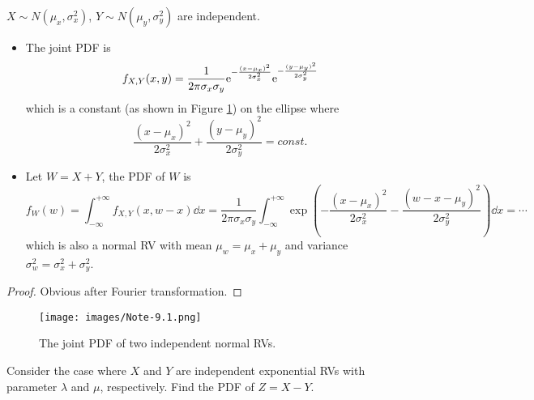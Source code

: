 \begin{example}
    $X \sim N(\mu_x, \sigma_x^2)$, $Y \sim N(\mu_y, \sigma_y^2)$ are independent. 
    \begin{itemize}
        \item The joint PDF is
        \begin{equation}
            f_{X, Y}(x, y) = \frac{1}{2 \pi \sigma_x \sigma_y} \mathrm{e}^{-\frac{(x - \mu_x)^2}{2 \sigma_x^2}} \mathrm{e}^{-\frac{(y - \mu_y)^2}{2 \sigma_y^2}}
        \end{equation}
        which is a constant (as shown in Figure \ref{fig:equal-probability-ellipse}) on the ellipse where
        \begin{equation}
            \frac{(x - \mu_x)^2}{2\sigma_x^2} + \frac{(y - \mu_y)^2}{2\sigma_y^2} = const.
        \end{equation}
        \item Let $W = X + Y$, the PDF of $W$ is
        \begin{equation}
            f_{W}(w) = \int_{-\infty}^{+\infty} f_{X, Y}(x, w - x) \dd{x} = \frac{1}{2\pi\sigma_x\sigma_y}\int_{-\infty}^{+\infty} \exp\left(-\frac{(x - \mu_x)^2}{2\sigma_x^2} -\frac{(w - x - \mu_y)^2}{2\sigma_y^2}\right) \dd{x}
            = \cdots
        \end{equation}
        which is also a normal RV with mean $\mu_w = \mu_x + \mu_y$ and variance $\sigma_w^2 = \sigma_x^2 + \sigma_y^2$.
    \end{itemize}
    \begin{proof}
        Obvious after Fourier transformation.
    \end{proof}
    \begin{figure}[H]
        \centering
        \texttt{[image: images/Note-9.1.png]}
        \caption{The joint PDF of two independent normal RVs.}
        \label{fig:equal-probability-ellipse}
    \end{figure}
\end{example}
\begin{example}
    Consider the case where $X$ and $Y$ are independent exponential RVs with parameter $\lambda$ and $\mu$, respectively. Find the PDF of $Z = X - Y$.
\end{example}
